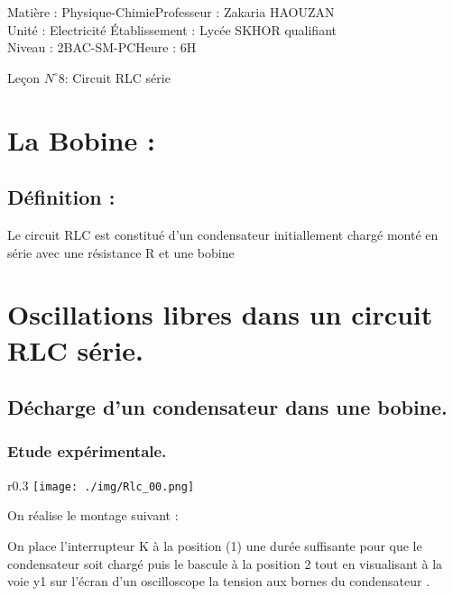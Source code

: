 \documentclass[12pt]{article}
\author{Zakaria HAOUZAN}
\date{\today}
\newcommand\headerMe[2]{\noindent{}#1\hfill#2}
\begin{document}
\headerMe{Matière : Physique-Chimie}{Professeur : Zakaria HAOUZAN}\\
\headerMe{Unité : Electricité }{Établissement : Lycée SKHOR qualifiant}\\
\headerMe{Niveau : 2BAC-SM-PC}{Heure : 6H}\\

\begin{center}

    \Large{Leçon $N^{\circ} 8 $: \color{red} Circuit RLC série }
\end{center}


\section{La Bobine : }
\subsection{Définition : }
Le circuit RLC est constitué d'un condensateur initiallement chargé monté en série avec une
résistance R et une bobine

\section{Oscillations libres dans un circuit RLC série.}
\subsection{Décharge d’un condensateur dans une bobine.}
\subsubsection{Etude expérimentale.}
\begin{wrapfigure}{r}{0.3\textwidth}
	\texttt{[image: ./img/Rlc\_00.png]}
\end{wrapfigure}


On réalise le montage suivant :

On place l'interrupteur K à la position (1) une durée suffisante pour que le condensateur soit chargé puis le bascule à
la position 2 tout en visualisant à la voie y1 sur l'écran d'un oscilloscope la tension aux bornes du condensateur .
\end{document}
